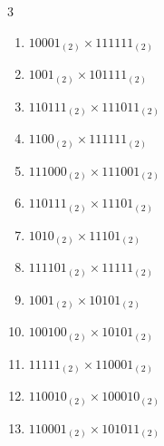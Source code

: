 \begin{multicols}{3}
\begin{enumerate}
  \item $10001_{(2)} \times 111111_{(2)}$


  \item $1001_{(2)} \times 101111_{(2)}$


  \item $110111_{(2)} \times 111011_{(2)}$


\columnbreak %

  \item $1100_{(2)} \times 111111_{(2)}$


  \item $111000_{(2)} \times 111001_{(2)}$


  \item $110111_{(2)} \times 11101_{(2)}$


  \item $1010_{(2)} \times 11101_{(2)}$


  \item $111101_{(2)} \times 11111_{(2)}$


\columnbreak %

\resetques

  \item $1001_{(2)} \times 10101_{(2)}$


  \item $100100_{(2)} \times 10101_{(2)}$


  \item $11111_{(2)} \times 110001_{(2)}$


  \item $110010_{(2)} \times 100010_{(2)}$


  \item $110001_{(2)} \times 101011_{(2)}$


\end{enumerate}
\end{multicols}
